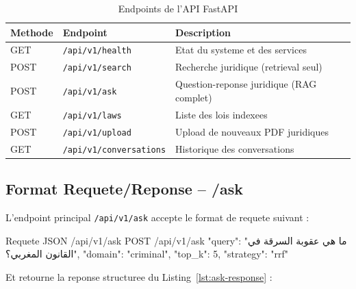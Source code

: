 \begin{table}[h]
\centering
\renewcommand{\arraystretch}{1.3}
\begin{tabular}{|l|l|l|}
\hline
\rowcolor{LightBlue}
\textbf{\color{PrimaryBlue}Methode} & \textbf{\color{PrimaryBlue}Endpoint} & \textbf{\color{PrimaryBlue}Description} \\
\hline
GET & \texttt{/api/v1/health} & Etat du systeme et des services \\
POST & \texttt{/api/v1/search} & Recherche juridique (retrieval seul) \\
POST & \texttt{/api/v1/ask} & Question-reponse juridique (RAG complet) \\
GET & \texttt{/api/v1/laws} & Liste des lois indexees \\
POST & \texttt{/api/v1/upload} & Upload de nouveaux PDF juridiques \\
GET & \texttt{/api/v1/conversations} & Historique des conversations \\
\hline
\end{tabular}
\caption{Endpoints de l'API FastAPI}
\label{tab:api-endpoints}
\end{table}

\subsection{Format Requete/Reponse -- /ask}

L'endpoint principal \texttt{/api/v1/ask} accepte le format de requete suivant :

\begin{jsonblock}{Requete JSON /api/v1/ask}
POST /api/v1/ask
{
  "query": "\textarabic{ما هي عقوبة السرقة في القانون المغربي؟}",
  "domain": "criminal",
  "top_k": 5,
  "strategy": "rrf"
}
\end{jsonblock}

Et retourne la reponse structuree du Listing~\ref{lst:ask-response} :


